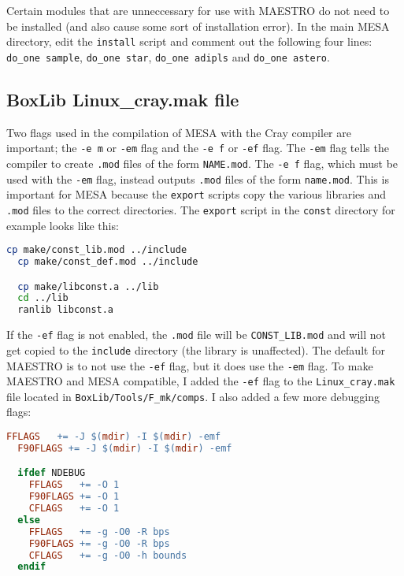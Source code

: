 Certain modules that are unneccessary for use with {\sf MAESTRO} do not need 
to be installed (and also cause some sort of installation error). In the 
main {\sf MESA} directory, edit the {\tt install} script and comment out 
the following four lines: {\tt do\_one sample}, {\tt do\_one star}, 
{\tt do\_one adipls} and {\tt do\_one astero}.

\subsection{{\sf BoxLib Linux\_cray.mak} file}

Two flags used in the compilation of {\sf MESA} with the Cray compiler are 
important; the {\tt -e m} or {\tt -em} flag and the {\tt -e f} or {\tt -ef} 
flag. The {\tt -em} flag tells the compiler to create {\tt .mod} files of the 
form {\tt NAME.mod}. The {\tt -e f} flag, which must be used with the 
{\tt -em} flag, instead outputs {\tt .mod} files of the form {\tt name.mod}. 
This is important for {\sf MESA} because the {\tt export} scripts copy the 
various libraries and {\tt .mod} files to the correct directories. The 
{\tt export} script in the {\tt const} directory for example looks like this:
\begin{lstlisting}[language=bash,mathescape=false]
  cp make/const_lib.mod ../include
  cp make/const_def.mod ../include

  cp make/libconst.a ../lib
  cd ../lib
  ranlib libconst.a
\end{lstlisting}
If the {\tt -ef} flag is not enabled, the {\tt .mod} file will be 
{\tt CONST\_LIB.mod} and will not get copied to the {\tt include} directory 
(the library is unaffected). The default for {\sf MAESTRO} is to not use 
the {\tt -ef} flag, but it does use the {\tt -em} flag. To make {\sf MAESTRO} 
and {\sf MESA} compatible, I added the {\tt -ef} flag to the 
{\tt Linux\_cray.mak} file located in {\tt BoxLib/Tools/F\_mk/comps}. I also 
added a few more debugging flags:
\begin{lstlisting}[language=make,mathescape=false]
  FFLAGS   += -J $(mdir) -I $(mdir) -emf
  F90FLAGS += -J $(mdir) -I $(mdir) -emf

  ifdef NDEBUG
    FFLAGS   += -O 1
    F90FLAGS += -O 1
    CFLAGS   += -O 1
  else
    FFLAGS   += -g -O0 -R bps
    F90FLAGS += -g -O0 -R bps
    CFLAGS   += -g -O0 -h bounds
  endif 
\end{lstlisting}

